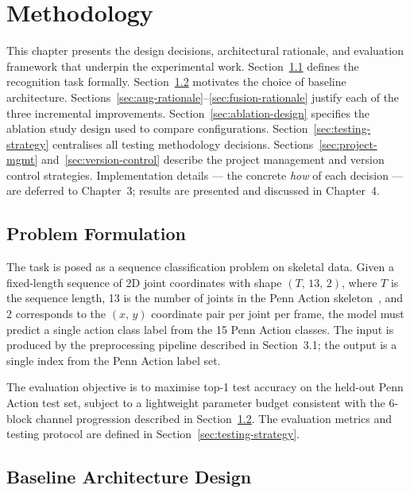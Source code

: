\chapter{Methodology}
\label{chapter2}

This chapter presents the design decisions, architectural rationale, and evaluation framework that underpin the experimental work. Section~\ref{sec:formulation} defines the recognition task formally. Section~\ref{sec:baseline-design} motivates the choice of baseline architecture. Sections~\ref{sec:aug-rationale}--\ref{sec:fusion-rationale} justify each of the three incremental improvements. Section~\ref{sec:ablation-design} specifies the ablation study design used to compare configurations. Section~\ref{sec:testing-strategy} centralises all testing methodology decisions. Sections~\ref{sec:project-mgmt} and~\ref{sec:version-control} describe the project management and version control strategies. Implementation details --- the concrete \emph{how} of each decision --- are deferred to Chapter~3; results are presented and discussed in Chapter~4.

\section{Problem Formulation}
\label{sec:formulation}

The task is posed as a sequence classification problem on skeletal data. Given a fixed-length sequence of 2D joint coordinates with shape $(T,\,13,\,2)$, where $T$ is the sequence length, 13 is the number of joints in the Penn Action skeleton~\cite{zhang2013actemes}, and 2 corresponds to the $(x,\,y)$ coordinate pair per joint per frame, the model must predict a single action class label from the 15 Penn Action classes. The input is produced by the preprocessing pipeline described in Section~3.1; the output is a single index from the Penn Action label set.

The evaluation objective is to maximise top-1 test accuracy on the held-out Penn Action test set, subject to a lightweight parameter budget consistent with the 6-block channel progression described in Section~\ref{sec:baseline-design}. The evaluation metrics and testing protocol are defined in Section~\ref{sec:testing-strategy}.

\section{Baseline Architecture Design}
\label{sec:baseline-design}

